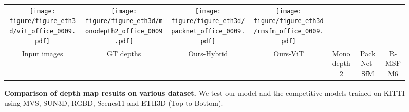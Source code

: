 \documentclass[letterpaper]{article} \usepackage{aaai23}  \usepackage{times}  \usepackage{helvet}  \usepackage{courier}  \usepackage[hyphens]{url}  \usepackage{graphicx} \urlstyle{rm} \def\UrlFont{\rm}  \usepackage{natbib}  \usepackage{caption} \frenchspacing  \setlength{\pdfpagewidth}{8.5in} \setlength{\pdfpageheight}{11in} \usepackage{algorithm}
\begin{document}
\begin{figure*}[t]
\begin{subfigure}
{\begin{tabular}{ccccccc}
        \texttt{[image: figure/figure\_eth3d/vit\_office\_0009.pdf]}& 
        \texttt{[image: figure/figure\_eth3d/monodepth2\_office\_0009.pdf]}& 
        \texttt{[image: figure/figure\_eth3d/packnet\_office\_0009.pdf]}& 
        \texttt{[image: figure/figure\_eth3d/rmsfm\_office\_0009.pdf]}\\ 
     \fontsize{40}{40} \selectfont Input images & 
     \fontsize{40}{40} \selectfont GT depths &
     \fontsize{40}{40} \selectfont Ours-Hybrid &
     \fontsize{40}{40} \selectfont Ours-ViT &
     \fontsize{40}{40} \selectfont Monodepth2 & 
     \fontsize{40}{40} \selectfont PackNet-SfM & 
     \fontsize{40}{40} \selectfont R-MSFM6
    \end{tabular}}
    \caption{\textbf{Comparison of depth map results on various dataset.} We test our model and the competitive models trained on KITTI using MVS, SUN3D, RGBD, Scenes11 and ETH3D (Top to Bottom).}
    \label{figure_result_demons}
     \end{subfigure}
\end{figure*}
\end{document}
